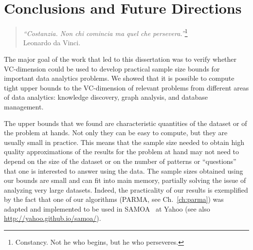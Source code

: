 \chapter{Conclusions and Future Directions}\label{ch:conclusions}
\begin{quote}
\begin{flushright}
  {\em ``Costanzia. Non chi comincia ma quel che
  persevera.''}\footnote{Constancy. Not he who begins, but he who perseveres.}\\
  Leonardo da Vinci.
\end{flushright}
\end{quote}

The major goal of the work that led to this dissertation was to verify whether
VC-dimension could be used to develop practical sample size bounds for important
data analytics problems. We showed that it is possible to compute tight upper
bounds to the VC-dimension of relevant problems from different areas of data
analytics: knowledge discovery, graph analysis, and database management. 

The upper bounds that we found are characteristic quantities of the dataset or of the
problem at hands. Not only they can be easy to compute, but they are usually
small in practice. This means that the sample size needed to obtain high quality
approximations of the results for the problem at hand may not need to depend on
the size of the dataset or on the number of patterns or ``questions'' that one
is interested to answer using the data. The sample sizes obtained using our
bounds are small and can fit into main memory, partially solving the issue of
analyzing very large datasets. Indeed, the practicality of our results is
exemplified by the fact that one of our algorithms (PARMA, see
Ch.~\ref{ch:parma}) was adapted and implemented to be used in
SAMOA~\citep{DFMorales13} at Yahoo (see also \url{http://yahoo.github.io/samoa/}).

